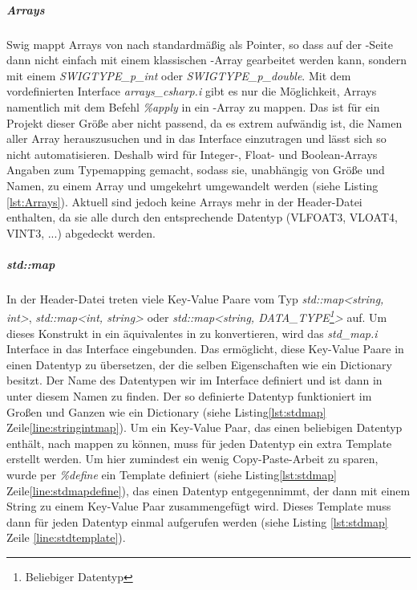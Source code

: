 \subparagraph{Arrays}
Swig mappt Arrays von \CC nach \CS standardmäßig als Pointer, so dass auf der \CS-Seite dann nicht einfach mit einem klassischen \CS-Array gearbeitet werden kann, sondern mit einem \emph{SWIGTYPE\_p\_int} oder \emph{SWIGTYPE\_p\_double}. Mit dem vordefinierten Interface \emph{arrays\_csharp.i} gibt es nur die Möglichkeit, Arrays namentlich mit dem Befehl \emph{\%apply} in ein \CS-Array zu mappen. Das ist für ein Projekt dieser Größe aber nicht passend, da es extrem aufwändig ist, die Namen aller Array herauszusuchen und in das Interface einzutragen und lässt sich so nicht automatisieren. Deshalb wird für Integer-, Float- und Boolean-Arrays Angaben zum Typemapping gemacht, sodass sie, unabhängig von Größe und Namen, zu einem \CS Array und umgekehrt umgewandelt werden (siehe Listing \ref{lst:Arrays}). Aktuell sind jedoch keine Arrays mehr in der Header-Datei enthalten, da sie alle durch den entsprechende Datentyp (VLFOAT3, VLOAT4, VINT3, ...) abgedeckt werden.

\begin{code}[caption={Beispiel Arraymapping},label={lst:Arrays}, escapechar=|]
\end{code}

\subparagraph{std::map}

In der Header-Datei treten viele Key-Value Paare vom Typ \emph{std::map<string, int>}, \emph{std::map<int, string>} oder \emph{std::map<string, DATA\_TYPE\footnote{Beliebiger Datentyp}>} auf. Um dieses Konstrukt in ein äquivalentes in \CS zu konvertieren, wird das \emph{std\_map.i} Interface in das Interface eingebunden. Das ermöglicht, diese Key-Value Paare in einen Datentyp zu übersetzen, der die selben Eigenschaften wie ein \CS Dictionary besitzt. Der Name des Datentypen wir im Interface definiert und ist dann in \CS unter diesem Namen zu finden. Der so definierte Datentyp funktioniert im Großen und Ganzen wie ein Dictionary (siehe Listing\ref{lst:stdmap} Zeile\ref{line:stringintmap}). Um ein Key-Value Paar, das einen beliebigen Datentyp enthält, nach \CS mappen zu können, muss für jeden Datentyp ein extra Template erstellt werden. Um hier zumindest ein wenig Copy-Paste-Arbeit zu sparen, wurde per \emph{\%define} ein Template definiert (siehe Listing\ref{lst:stdmap} Zeile\ref{line:stdmapdefine}), das einen Datentyp entgegennimmt, der dann mit einem String zu einem Key-Value Paar zusammengefügt wird. Dieses Template muss dann für jeden Datentyp einmal aufgerufen werden (siehe Listing \ref{lst:stdmap} Zeile \ref{line:stdtemplate}). 

